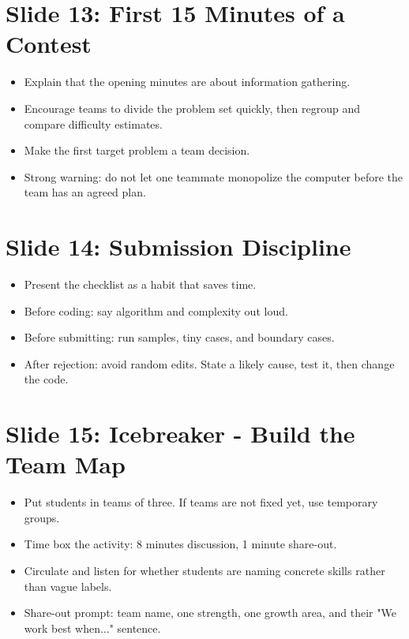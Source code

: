\documentclass[11pt]{article}
\begin{document}
\section*{Slide 13: First 15 Minutes of a Contest}
\begin{itemize}
  \item Explain that the opening minutes are about information gathering.
  \item Encourage teams to divide the problem set quickly, then regroup and compare difficulty estimates.
  \item Make the first target problem a team decision.
  \item Strong warning: do not let one teammate monopolize the computer before the team has an agreed plan.
\end{itemize}

\section*{Slide 14: Submission Discipline}
\begin{itemize}
  \item Present the checklist as a habit that saves time.
  \item Before coding: say algorithm and complexity out loud.
  \item Before submitting: run samples, tiny cases, and boundary cases.
  \item After rejection: avoid random edits. State a likely cause, test it, then change the code.
\end{itemize}

\section*{Slide 15: Icebreaker - Build the Team Map}
\begin{itemize}
  \item Put students in teams of three. If teams are not fixed yet, use temporary groups.
  \item Time box the activity: 8 minutes discussion, 1 minute share-out.
  \item Circulate and listen for whether students are naming concrete skills rather than vague labels.
  \item Share-out prompt: team name, one strength, one growth area, and their "We work best when..." sentence.
\end{itemize}
\end{document}
